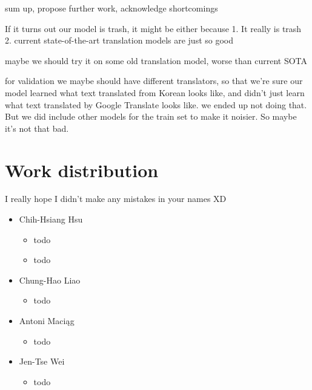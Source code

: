 \documentclass[twocolumn]{article}
\begin{document}
sum up, propose further work, acknowledge shortcomings

If it turns out our model is trash, it might be either because 1. It really is trash 2. current state-of-the-art translation models are just so good

maybe we should try it on some old translation model, worse than current SOTA

for validation we maybe should have different translators, so that we're sure our model learned what text translated from Korean looks like, and didn't just learn what text translated by Google Translate looks like.
we ended up not doing that. But we did include other models for the train set to make it noisier. So maybe it’s not that bad. 


\section*{Work distribution}

I really hope I didn't make any mistakes in your names XD

\begin{itemize}
	\item Chih-Hsiang Hsu
	\begin{itemize}
		\item todo
		\item todo
	\end{itemize}
	
	\item Chung-Hao Liao
	\begin{itemize}
		\item todo
	\end{itemize}
	
	\item Antoni Maciąg
	\begin{itemize}
		\item todo
	\end{itemize}
	
	\item Jen-Tse Wei
	\begin{itemize}
		\item todo
	\end{itemize}
\end{itemize}
\end{document}
